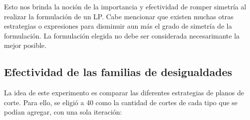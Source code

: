 Esto nos brinda la noción de la importancia y efectividad de romper simetría al realizar la formulación de un LP. Cabe mencionar que existen muchas otras estrategias o expresiones para disminuir aun más el grado de simetría de la formulación. La formulación elegida no debe ser considerada necesarimante la mejor posible.

\pagebreak

\subsection{Efectividad de las familias de desigualdades}

La idea de este experimento es comparar las diferentes estrategias de planos de corte. Para ello, se eligió a 40 como la cantidad de cortes de cada tipo que se podían agregar, con una sola iteración:

